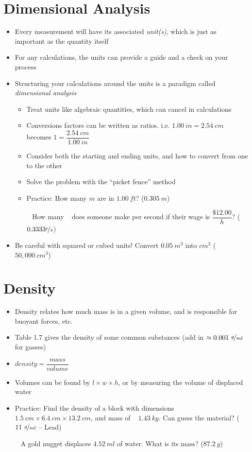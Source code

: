 \documentclass[12pt, openany, letterpaper]{memoir}
\begin{document}
\section{Dimensional Analysis}
\begin{itemize}
	\item Every measurement will have its associated \emph{unit(s)}, which is just as important as the quantity itself
	\item For any calculations, the units can provide a guide and a check on your process
	\item Structuring your calculations around the units is a paradigm called \emph{dimensional analysis}
	\begin{itemize}
		\item Treat units like algebraic quantities, which can cancel in calculations
		\item Conversions factors can be written as ratios. i.e. $1.00~in = 2.54~cm$ becomes $1=\dfrac{2.54~cm}{1.00~in}$
		\item Consider both the starting and ending units, and how to convert from one to the other
		\item Solve the problem with the ``picket fence'' method
		\item Practice: How many $m$ are in $1.00~ft$? ($0.305~m$)
		
		~\hphantom{Practice:} How many \textcent~ does someone make per second if their wage is $\dfrac{\$12.00}{h}$? ($0.3333\nicefrac{c}{s}$)
	\end{itemize}
	\item Be careful with squared or cubed units! Convert $0.05~m^3$ into $cm^3$ ($50,000~cm^3$)
\end{itemize}
\section{Density}
\begin{itemize}
	\item Density relates how much mass is in a given volume, and is responsible for buoyant forces, etc.
	\item Table 1.7 gives the density of some common substances (add in $\approx 0.001~\nicefrac{g}{ml}$ for gasses)
	\item $density=\dfrac{mass}{volume}$
	\item Volumes can be found by $l\times w\times h$, or by measuring the volume of displaced water
	\item Practice: Find the density of a block with dimensions $1.5~cm\times6.4~cm\times13.2~cm$, and mass of 	~\hphantom{Practice:} $1.43~kg$. Can guess the material? ($11~\nicefrac{g}{ml}$ -- Lead)
	
	~\hphantom{Practice:} A gold nugget displaces $4.52~ml$ of water. What is its mass? ($87.2~g$)
\end{itemize}
\end{document}
